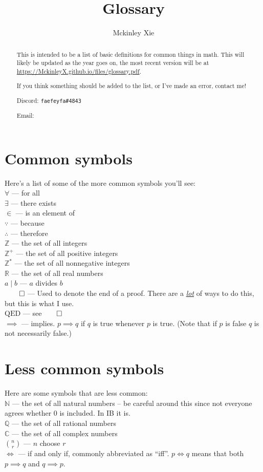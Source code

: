 \documentclass[a4paper]{scrartcl}
\title{Glossary}
\author{Mckinley Xie}
\newcommand{\term}[2]{\\$#1$  ---  #2}
\begin{document}
\maketitle
\begin{abstract}
	This is intended to be a list of basic definitions for common things in math. This will likely be updated as the year goes on, the most recent version will be at \url{https://MckinleyX.github.io/files/glossary.pdf}.

	If you think something should be added to the list, or I've made an error, contact me!

	Discord: \texttt{faefeyfa\#4843}

	Email: 
\end{abstract}
\section{Common symbols}
Here's a list of some of the more common symbols you'll see:
	\term{\forall}{for all} 
	\term{\exists}{there exists} 
	\term{\in}{is an element of}
	\term{\because}{because}
	\term{\therefore}{therefore}
	\term{\mathbb{Z}}{the set of all integers}
	\term{\mathbb{Z}^+}{the set of all positive integers}
	\term{\mathbb{Z}^*}{the set of all nonnegative integers}
	\term{\mathbb{R}}{the set of all real numbers}
	\term{a \mid b}{$a$ divides $b$}
	\term{\qed}{Used to denote the end of a proof. There are a \href{https://mathwithbaddrawings.com/2019/10/02/how-to-end-a-proof/}{\emph{lot}} of ways to do this, but this is what I use.}
	\term{\text{QED}}{see$\qed$}
	\term{\implies}{implies. $p \implies q$ if $q$ is true whenever $p$ is true. (Note that if $p$ is false $q$ is not necessarily false.)}
\section{Less common symbols}
Here are some symbols that are less common:
	\term{\mathbb{N}}{the set of all natural numbers -- be careful around this since not everyone agrees whether 0 is included. In IB it is.}
	\term{\mathbb{Q}}{the set of all rational numbers}
	\term{\mathbb{C}}{the set of all complex numbers}
	\term{\binom{n}{r}}{$n$ choose $r$}
	\term{\iff}{if and only if, commonly abbreviated as ``iff''. $p \iff q$ means that both $p \implies q$ and $q \implies p$.}
\end{document}
